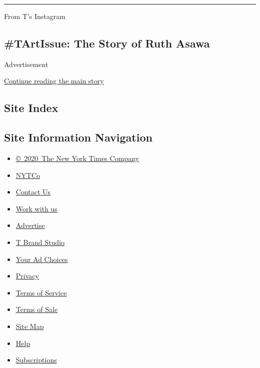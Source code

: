 \begin{center}\rule{0.5\linewidth}{\linethickness}\end{center}

From T's Instagram

\hypertarget{tartissue-the-story-of-ruth-asawa}{%
\subsection{\#TArtIssue: The Story of Ruth
Asawa}\label{tartissue-the-story-of-ruth-asawa}}

Advertisement

\protect\hyperlink{after-bottom}{Continue reading the main story}

\hypertarget{site-index}{%
\subsection{Site Index}\label{site-index}}

\hypertarget{site-information-navigation}{%
\subsection{Site Information
Navigation}\label{site-information-navigation}}

\begin{itemize}
\tightlist
\item
  \href{https://help.nytimes.com/hc/en-us/articles/115014792127-Copyright-notice}{©~2020~The
  New York Times Company}
\end{itemize}

\begin{itemize}
\tightlist
\item
  \href{https://www.nytco.com/}{NYTCo}
\item
  \href{https://help.nytimes.com/hc/en-us/articles/115015385887-Contact-Us}{Contact
  Us}
\item
  \href{https://www.nytco.com/careers/}{Work with us}
\item
  \href{https://nytmediakit.com/}{Advertise}
\item
  \href{http://www.tbrandstudio.com/}{T Brand Studio}
\item
  \href{https://www.nytimes.com/privacy/cookie-policy\#how-do-i-manage-trackers}{Your
  Ad Choices}
\item
  \href{https://www.nytimes.com/privacy}{Privacy}
\item
  \href{https://help.nytimes.com/hc/en-us/articles/115014893428-Terms-of-service}{Terms
  of Service}
\item
  \href{https://help.nytimes.com/hc/en-us/articles/115014893968-Terms-of-sale}{Terms
  of Sale}
\item
  \href{https://spiderbites.nytimes.com}{Site Map}
\item
  \href{https://help.nytimes.com/hc/en-us}{Help}
\item
  \href{https://www.nytimes.com/subscription?campaignId=37WXW}{Subscriptions}
\end{itemize}
